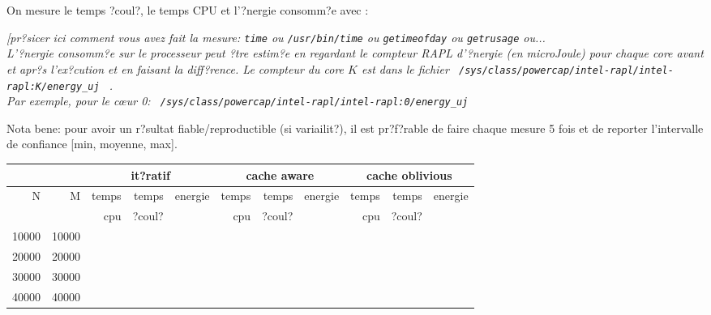 \documentclass[10pt,a4paper]{article}
\begin{document}
On mesure le temps ?coul?, le temps CPU et l'?nergie consomm?e avec : {\em  [pr?sicer ici comment vous avez fait la mesure:
{\tt time} 
ou {\tt /usr/bin/time}
ou {\tt getimeofday}
ou {\tt getrusage}
ou... \\
L'?nergie consomm?e sur le processeur peut ?tre estim?e en regardant le compteur RAPL d'?nergie (en microJoule)
pour chaque core avant et apr?s l'ex?cution et en faisant la diff?rence.
Le compteur du core $K$ est dans le fichier 
\verb+ /sys/class/powercap/intel-rapl/intel-rapl:K/energy_uj + .\\
Par exemple, pour le c{\oe}ur 0: 
\verb+ /sys/class/powercap/intel-rapl/intel-rapl:0/energy_uj +

Nota bene: pour avoir un r?sultat fiable/reproductible (si variailit?), 
il est pr?f?rable de faire chaque mesure 5 fois et de reporter l'intervalle
de confiance [min, moyenne, max]. 

\begin{tabular}{|r|r||r|r|r||r|r|r||r|r|r||}
\hline
 \multicolumn{2}{|c||}{ } 
& \multicolumn{3}{c||}{it?ratif}
& \multicolumn{3}{c||}{cache aware}
& \multicolumn{3}{c||}{cache oblivious}
\\ \hline
N & M 
& temps   & temps & energie       %
& temps   & temps & energie       %
& temps   & temps & energie       %
\\
& 
& cpu     & ?coul?&               %
& cpu     & ?coul?&               %
& cpu     & ?coul?&               %
\\ \hline
\hline
10000 & 10000 
&  &  &   %
&  &  &   %
&  &  &   %
\\ \hline
20000 & 20000 
&  &  &   %
&  &  &   %
&  &  &   %
\\ \hline
30000 & 30000 
&  &  &   %
&  &  &   %
&  &  &   %
\\ \hline
40000 & 40000 
&  &  &   %
&  &  &   %
&  &  &   %
\\ \hline
\hline
\end{tabular}
}
\end{document}
